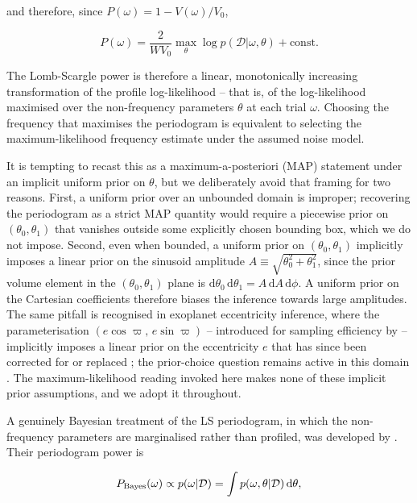 \documentclass[apj]{emulateapj}
\begin{document}
and therefore, since $P(\omega) = 1 - V(\omega) / V_0$,

\begin{equation}
\label{eq:lsasml}
    P(\omega) = \frac{2}{W V_0} \max_\theta \log p(\mathcal{D}|\omega, \theta) + \mathrm{const.}
\end{equation}

The Lomb-Scargle power is therefore a linear, monotonically increasing
transformation of the profile log-likelihood -- that is, of the log-likelihood
maximised over the non-frequency parameters $\theta$ at each trial $\omega$.
Choosing the frequency that maximises the periodogram is equivalent to
selecting the maximum-likelihood frequency estimate under the assumed noise
model.

It is tempting to recast this as a maximum-a-posteriori (MAP) statement under
an implicit uniform prior on $\theta$, but we deliberately avoid that framing
for two reasons. First, a uniform prior over an unbounded domain is improper;
recovering the periodogram as a strict MAP quantity would require a piecewise
prior on $(\theta_0, \theta_1)$ that vanishes outside some explicitly chosen
bounding box, which we do not impose. Second, even when bounded, a uniform
prior on $(\theta_0, \theta_1)$ implicitly imposes a linear prior on the
sinusoid amplitude $A \equiv \sqrt{\theta_0^2 + \theta_1^2}$, since the prior
volume element in the $(\theta_0, \theta_1)$ plane is
$\mathrm{d}\theta_0\,\mathrm{d}\theta_1 = A\,\mathrm{d}A\,\mathrm{d}\phi$.
A uniform prior on the Cartesian coefficients therefore biases the inference
towards large amplitudes. The same pitfall is recognised in exoplanet
eccentricity inference, where the parameterisation
$(e\cos\varpi,\, e\sin\varpi)$ -- introduced for sampling efficiency by
\cite{Ford_2006} -- implicitly imposes a linear prior on the eccentricity $e$
that has since been corrected for or replaced
\citep{Eastman_etal_2013}; the prior-choice question remains active in this domain \citep{Stevenson_etal_2025}. The maximum-likelihood reading invoked here makes
none of these implicit prior assumptions, and we adopt it throughout.

A genuinely Bayesian treatment of the LS periodogram, in which the
non-frequency parameters are marginalised rather than profiled, was developed
by \cite{Mortier_et_al_2015,Mortier_et_al_2015_code}. Their periodogram power
is

\begin{equation*}
P_{\rm Bayes}(\omega) \propto p(\omega|\mathcal{D}) = \int p(\omega, \theta|\mathcal{D})\,\mathrm{d}\theta,
\end{equation*}
\end{document}
